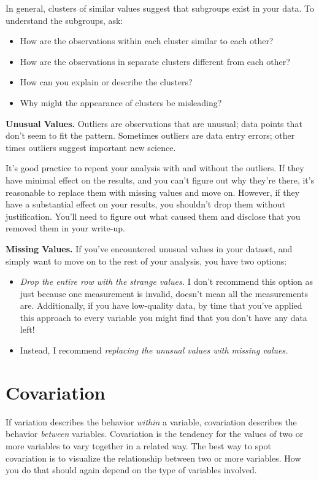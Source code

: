 \documentclass{article}
\begin{document}
In general, clusters of similar values suggest that subgroups exist in your data. To understand the subgroups, ask:

\begin{itemize}
	\item How are the observations within each cluster similar to each other?
	\item How are the observations in separate clusters different from each other?
	\item How can you explain or describe the clusters?
	\item Why might the appearance of clusters be misleading?
\end{itemize}

\textbf{Unusual Values.} Outliers are observations that are unusual; data points that don’t seem to fit the pattern. Sometimes outliers are data entry errors; other times outliers suggest important new science.

It’s good practice to repeat your analysis with and without the outliers. If they have minimal effect on the results, and you can’t figure out why they’re there, it’s reasonable to replace them with missing values and move on. However, if they have a substantial effect on your results, you shouldn’t drop them without justification. You’ll need to figure out what caused them and disclose that you removed them in your write-up.

\textbf{Missing Values.} If you’ve encountered unusual values in your dataset, and simply want to move on to the rest of your analysis, you have two options:

\begin{itemize}
\item \textit{Drop the entire row with the strange values.} I don’t recommend this option as just because one measurement is invalid, doesn’t mean all the measurements are. Additionally, if you have low-quality data, by time that you’ve applied this approach to every variable you might find that you don’t have any data left!
\item Instead, I recommend \textit{replacing the unusual values with missing values.}
\end{itemize}

\section{Covariation}

If variation describes the behavior \textit{within} a variable, covariation describes the behavior \textit{between} variables. Covariation is the tendency for the values of two or more variables to vary together in a related way. The best way to spot covariation is to visualize the relationship between two or more variables. How you do that should again depend on the type of variables involved.
\end{document}
